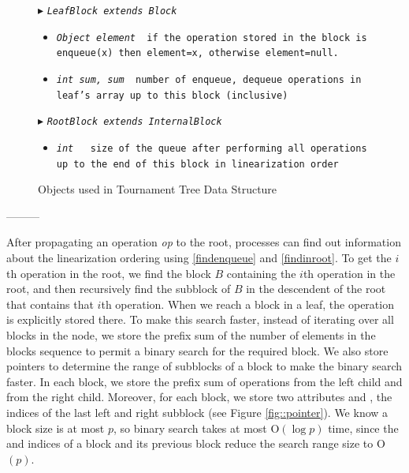 \begin{figure}
\begin{algorithmic}[1]
\Statex $\blacktriangleright$ \tt{\sl{LeafBlock} extends \sl{Block}} 
\begin{itemize}
  \item \tt{\sl{Object} element}
  \textsf{\com\ if the operation stored in the block is \tt{enqueue(x)} then \tt{element=x}, otherwise \tt{element=null}.}
  
    \item \tt{\sl{int} sum, sum}
  \textsf{\com\ number of enqueue, dequeue operations in  leaf's  array up to this block (inclusive)}
\end{itemize}

\Statex $\blacktriangleright$ \tt{\sl{RootBlock} extends \sl{InternalBlock}} 
\begin{itemize}
  \item \tt{\sl{int} \size}%
  \textsf{\com\ size of the queue after performing all operations up to the end of this block in linearization order}
\end{itemize}

\end{algorithmic}
\caption{Objects used in Tournament Tree Data Structure \label{object-fields}}
\end{figure}

---------


After propagating an operation \textit{op} to the root, processes can
find out information about the linearization ordering using \ref{findenqueue} and
\ref{findinroot}.  
To get the $i$th operation in the root, we find the block $B$
containing the $i$th operation in the root, and then recursively find
the subblock of $B$ in the descendent of the root that contains that
$i$th operation. When we reach a block in a leaf, the operation is
explicitly stored there. To make this search faster, instead of
iterating over all blocks in the node, we store the prefix sum of the
number of elements in the blocks sequence to permit a binary search
for the required block. We also store pointers to determine the range
of subblocks of a block to make the binary search faster. In each
block, we store the prefix sum of operations from the left child and
from the right child. Moreover, for each block, we store two
attributes  and , the indices of
the last left and right subblock (see Figure \ref{fig::pointer}). We
know a block size is at most $p$, so binary search takes at most
\textsc{O}$(\log p)$ time, since the  and
 indices of a block and its previous block reduce
the search range size to \textsc{O}$(p)$. 

